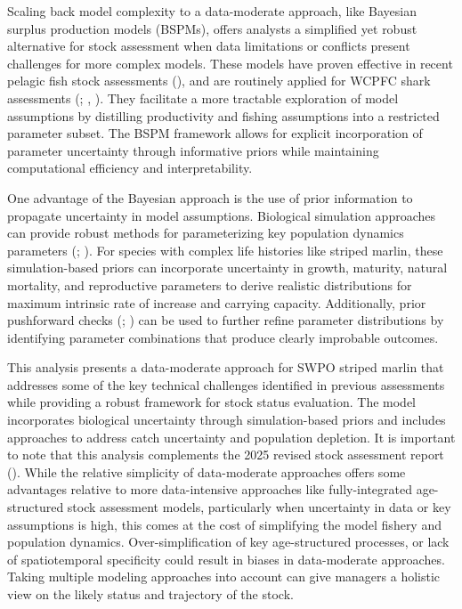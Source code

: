\documentclass[
  11pt,
]{SCreport}
\begin{document}
Scaling back model complexity to a data-moderate approach, like Bayesian
surplus production models (BSPMs), offers analysts a simplified yet
robust alternative for stock assessment when data limitations or
conflicts present challenges for more complex models. These models have
proven effective in recent pelagic fish stock assessments
(), and are
routinely applied for WCPFC shark assessments
(;
,
). They facilitate a more
tractable exploration of model assumptions by distilling productivity
and fishing assumptions into a restricted parameter subset. The BSPM
framework allows for explicit incorporation of parameter uncertainty
through informative priors while maintaining computational efficiency
and interpretability.

One advantage of the Bayesian approach is the use of prior information
to propagate uncertainty in model assumptions. Biological simulation
approaches can provide robust methods for parameterizing key population
dynamics parameters (;
). For species with
complex life histories like striped marlin, these simulation-based
priors can incorporate uncertainty in growth, maturity, natural
mortality, and reproductive parameters to derive realistic distributions
for maximum intrinsic rate of increase and carrying capacity.
Additionally, prior pushforward checks
(;
) can be used to
further refine parameter distributions by identifying parameter
combinations that produce clearly improbable outcomes.

This analysis presents a data-moderate approach for SWPO striped marlin
that addresses some of the key technical challenges identified in
previous assessments while providing a robust framework for stock status
evaluation. The model incorporates biological uncertainty through
simulation-based priors and includes approaches to address catch
uncertainty and population depletion. It is important to note that this
analysis complements the 2025 revised stock assessment report
(). While the relative simplicity of data-moderate approaches offers
some advantages relative to more data-intensive approaches like
fully-integrated age-structured stock assessment models, particularly
when uncertainty in data or key assumptions is high, this comes at the
cost of simplifying the model fishery and population dynamics.
Over-simplification of key age-structured processes, or lack of
spatiotemporal specificity could result in biases in data-moderate
approaches. Taking multiple modeling approaches into account can give
managers a holistic view on the likely status and trajectory of the
stock.
\end{document}
